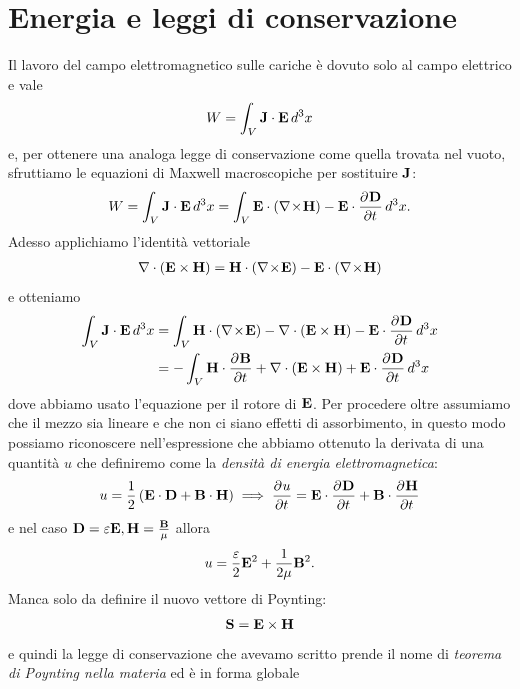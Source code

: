 \section{Energia e leggi di conservazione}
Il lavoro del campo elettromagnetico sulle cariche è dovuto solo al campo elettrico e vale 
\begin{align}
  W = \int_V \mathbf{J \cdot E} \,d^3x
\end{align}
e, per ottenere una analoga legge di conservazione come quella trovata nel vuoto, sfruttiamo le equazioni di Maxwell macroscopiche per sostituire  $ \mathbf{J} $:
\begin{align}
  W = \int_V \mathbf{J \cdot E} \,d^3x = \int_V \mathbf{E} \cdot \left( \nabla\!\times\!\mathbf{ H } \right) - \mathbf{E} \cdot \frac{\partial^{} {\mathbf{D}}}{\partial {t}^{}} \, d^3x.
\end{align}
Adesso applichiamo l'identità vettoriale
\begin{align}
  \nabla \cdot \left( \mathbf{E \times H} \right) = \mathbf{H} \cdot \left( \nabla\!\times\!\mathbf{ E } \right)
  - \mathbf{E} \cdot \left( \nabla\!\times\!\mathbf{ H } \right) 
\end{align}
e otteniamo
\begin{align}
  \int_V \mathbf{J \cdot E} \,d^3x &= \int_V \mathbf{H} \cdot \left( \nabla\!\times\!\mathbf{ E } \right) - \nabla \cdot \left( \mathbf{E \times H} \right)
  - \mathbf{E} \cdot \frac{\partial^{} {\mathbf{D}}}{\partial {t}^{}} \, d^3x 
  \\
  &= - \int_V \mathbf{H} \cdot \frac{\partial^{} {\mathbf{B}}}{\partial {t}^{}} + \nabla \cdot \left( \mathbf{E \times H} \right)
  + \mathbf{E} \cdot \frac{\partial^{} {\mathbf{D}}}{\partial {t}^{}} \, d^3x 
\end{align}
dove abbiamo usato l'equazione per il rotore di $ \mathbf{E} $. Per procedere oltre assumiamo che il mezzo sia lineare e che non ci siano effetti di 
assorbimento, in questo modo possiamo riconoscere nell'espressione che abbiamo ottenuto la derivata di una quantità $ u $ che definiremo come la 
\textit{densità di energia elettromagnetica}:
\begin{align}
  u = \frac{1}{2} \left( \mathbf{E \cdot D} + \mathbf{B \cdot H}  \right) \implies \frac{\partial^{} {u}}{\partial {t}^{}} = \mathbf{E} \cdot \frac{\partial^{} {\mathbf{D}}}{\partial {t}^{}} + \mathbf{B} \cdot \frac{\partial^{} {\mathbf{H}}}{\partial {t}^{}} 
\end{align}
e nel caso $ \mathbf{D} = \varepsilon \mathbf{E}, \mathbf{H} = \frac{\mathbf{B}}{\mu} $ allora 
\begin{align}
  u = \frac{\varepsilon}{2}\mathbf{E}^2 + \frac{1}{2\mu} \mathbf{B}^2.
\end{align}
Manca solo da definire il nuovo vettore di Poynting:
\begin{align}
  \mathbf{S} = \mathbf{E \times H}
\end{align}
e quindi la legge di conservazione che avevamo scritto prende il nome di \textit{teorema di Poynting nella materia} ed è in forma globale
